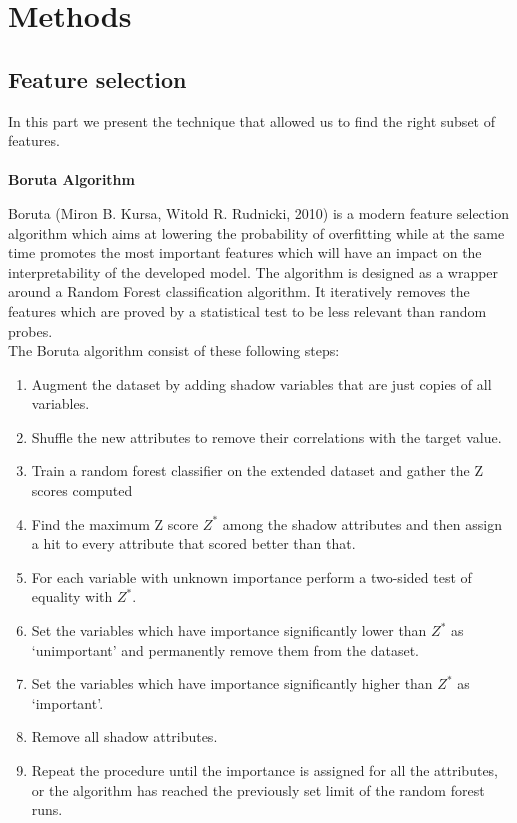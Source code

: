 \section{Methods}
\label{sec:methods}
\subsection{Feature selection}
In this part we present the technique that allowed us to find the right subset of features.\\\\
\textbf{Boruta Algorithm}

Boruta (Miron B. Kursa, Witold R. Rudnicki, 2010) is a modern feature selection algorithm which aims at lowering the probability of overfitting while at the same time promotes the most important features which will have an impact on the interpretability of the developed model. The algorithm is designed as a wrapper around a Random Forest classification algorithm. It iteratively removes the features which are
proved by a statistical test to be less relevant than random probes.\\
The Boruta algorithm consist of these following steps:
\begin{enumerate}
    \item Augment the dataset by adding shadow variables that are just copies of all variables.
    \item Shuffle the new attributes to remove their correlations with the target value.
    \item Train a random forest classifier on the extended dataset and gather the Z scores computed
    \item Find the maximum Z score $Z^*$ among the shadow attributes and then assign a hit to every attribute that scored better than that.
    \item For each variable with unknown importance perform a two-sided test of equality with $Z^*$.
    \item Set the variables which have importance significantly lower than $Z^*$ as ‘unimportant’ and permanently remove them from the dataset.
    \item Set the variables which have importance significantly higher than $Z^*$ as ‘important’.
    \item Remove all shadow attributes.
    \item Repeat the procedure until the importance is assigned for all the attributes, or the algorithm has reached the previously set limit of the random forest runs.
\end{enumerate}
